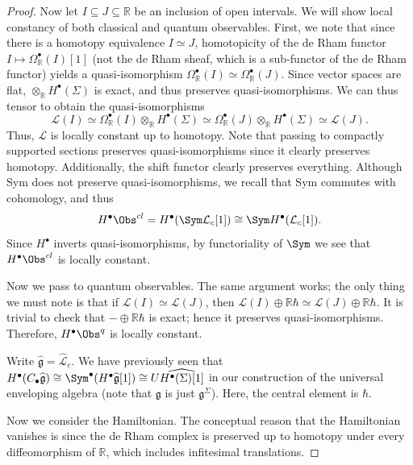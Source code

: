 \begin{proof}
	Now let $I\subseteq J\subseteq \mathbb{R} $ be an inclusion of open intervals. We will show local constancy of both classical and quantum observables. First, we note that since there is a homotopy equivalence $I\simeq J$, homotopicity of the de Rham functor $I\mapsto \Omega ^{\bullet} _\mathbb{R} (I)[1]$ (not the de Rham sheaf, which is a sub-functor of the de Rham functor) yields a quasi-isomorphism $\Omega ^{\bullet} _\mathbb{R} (I)\simeq \Omega ^{\bullet} _\mathbb{R}(J)$. Since vector spaces are flat, $\otimes _\mathbb{R} H^{\bullet} (\Sigma)$ is exact, and thus preserves quasi-isomorphisms. We can thus tensor to obtain the quasi-isomorphisms
	\[
		\mathcal{L}(I) \simeq \Omega ^{\bullet} _\mathbb{R} (I) \otimes_{\mathbb{R}} H^{\bullet} (\Sigma ) \simeq \Omega ^{\bullet} _{\mathbb{R} } (J) \otimes _{\mathbb{R} } H^{\bullet} (\Sigma ) \simeq \mathcal{L} (J)
	.\]
	Thus, $\mathcal{L} $ is locally constant up to homotopy. Note that passing to compactly supported sections preserves quasi-isomorphisms since it clearly preserves homotopy. Additionally, the shift functor clearly preserves everything. Although Sym does not preserve quasi-isomorphisms, we recall that Sym commutes with cohomology, and thus
	\[
		H^{\bullet} \Obs^{cl} =H^{\bullet} (\Sym \mathcal{L} _c[1])\cong \Sym H^{\bullet} (\mathcal{L}_c[1])
	.\]
	Since $H^{\bullet} $ inverts quasi-isomorphisms, by functoriality of $\Sym $ we see that $H^{\bullet} \Obs^{cl} $ is locally constant.

	Now we pass to quantum observables. The same argument works; the only thing we must note is that if $\mathcal{L} (I) \simeq \mathcal{L} (J)$, then $\mathcal{L} (I)\oplus \mathbb{R} \hbar  \simeq \mathcal{L} (J) \oplus \mathbb{R} \hbar $. It is trivial to check that $-\oplus \mathbb{R} \hbar $ is exact; hence it preserves quasi-isomorphisms. Therefore, $H^{\bullet}\Obs^{q} $ is locally constant.

	Write $\widehat{\mathfrak{g} }=\widehat{\mathcal{L}}_c $. We have previously seen that $H^{\bullet} (C_{\bullet} \widehat{\mathfrak{g} })\cong \Sym^{\bullet} (H^{\bullet} \widehat{\mathfrak{g} } [1]) \cong U\widehat{H^{\bullet} (\Sigma )[1]} $ in our construction of the universal enveloping algebra (note that $\mathfrak{g} $ is just $\mathfrak{g} ^{\Sigma } $). Here, the central element is $\hbar $.

	Now we consider the Hamiltonian. The conceptual reason that the Hamiltonian vanishes is since the de Rham complex is preserved up to homotopy under every diffeomorphism of $\mathbb{R} $, which includes infitesimal translations.


\end{proof}
